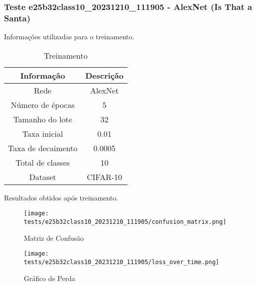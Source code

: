 \subsubsection{Teste e25b32class10_20231210_111905 - AlexNet (Is That a Santa)}

Informações utilizadas para o treinamento.

\begin{table}[ht]
   \centering
   \caption{Treinamento}
   \label{tab:modelos}
   \begin{tabular}{| c | c | }
      \hline 
      \textbf{Informação} & \textbf{Descrição} \\
      \hline \hline 
      Rede & AlexNet \\
      \hline
      Número de épocas & 5\\
      \hline
      Tamanho do lote & 32\\
      \hline
      Taxa inicial & 0.01 \\
      \hline
      Taxa de decaimento & 0.0005 \\
      \hline
      Total de classes & 10\\
      \hline
      Dataset & CIFAR-10\\
      \hline
   \end{tabular} 
\end{table}

Resultados obtidos após treinamento.


\begin{figure}[ht]
 \begin{center}
   \texttt{[image: tests/e25b32class10\_20231210\_111905/confusion\_matrix.png]}
  \caption{Matriz de Confusão}
  \label{fig:fig03}
 \end{center}
\end{figure}

\begin{figure}[ht]
 \begin{center}
   \texttt{[image: tests/e25b32class10\_20231210\_111905/loss\_over\_time.png]}
  \caption{Gráfico de Perda}
  \label{fig:fig04}
 \end{center}
\end{figure}
